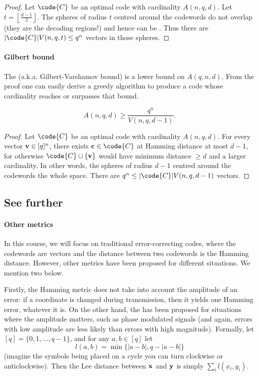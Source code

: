 \documentclass[a4paper, 11pt, openany]{book}
\begin{document}
\begin{proof}
Let $\code{C}$ be an optimal code with cardinality $A(n,q,d)$. Let $t = \left\lfloor \frac{d-1}{2} \right\rfloor$. The spheres of radius $t$ centred around the codewords do not overlap (they are the decoding regions!) and hence can be . Thus there are $|\code{C}| V(n,q,t) \le q^n$ vectors in those spheres.
\end{proof}

\paragraph{Gilbert bound}
The  (a.k.a. Gilbert-Varshamov bound) is a lower bound on $A(q,n,d)$. From the proof one can easily derive a greedy algorithm to produce a code whose cardinality reaches or surpasses that bound.

\begin{theorem}
\[
	A(n,q,d) \ge \frac{ q^n }{ V(n, q, d-1 ) }.
\]
\end{theorem}

\begin{proof}
Let $\code{C}$ be an optimal code with cardinality $A(n,q,d)$. For every vector ${\bf v} \in [q]^n$, there exists ${\bf c} \in \code{C}$ at Hamming distance at most $d-1$, for otherwise $\code{C} \cup \{ {\bf v} \}$ would have minimum distance $\ge d$ and a larger cardinality. In other words, the spheres of radius $d-1$ centred around the codewords  the whole space. There are $q^n \le |\code{C}| V(n,q,d-1)$ vectors.
\end{proof}


\subsection{See further}

\paragraph{Other metrics}
In this course, we will focus on traditional error-correcting codes, where the codewords are vectors and the distance between two codewords is the Hamming distance. However, other metrics have been proposed for different situations. We mention two below.

Firstly, the Hamming metric does not take into account the amplitude of an error: if a coordinate is changed during transmission, then it yields one Hamming error, whatever it is. On the other hand, the  has been proposed for situations where the amplitude matters, such as phase modulated signals (and again, errors with low amplitude are less likely than errors with high magnitude). Formally, let $[q] = \{0, 1, \dots, q-1\}$, and for any $a,b \in [q]$ let
\[
    l(a,b) = \min\{ |a - b|, q - |a - b| \}
\]
(imagine the symbols being placed on a cycle you can turn clockwise or anticlockwise). Then the Lee distance between ${\bf x}$ and ${\bf y}$ is simply $\sum_i l(x_i,y_i)$.
\end{document}
